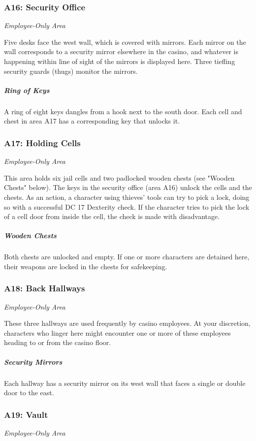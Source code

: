 \documentclass[10pt,a4paper,twoside,bg=print,twocolumn,openany,nodeprecatedcode]{dndbook}
\begin{document}
\subsubsection{A16: Security Office}
\textit{Employee-Only Area}

Five desks face the west wall, which is covered with mirrors. Each mirror on the wall corresponds to a security mirror elsewhere in the casino, and whatever is happening within line of sight of the mirrors is displayed here. Three tiefling security guards (thugs) monitor the mirrors.

\subparagraph{Ring of Keys}
A ring of eight keys dangles from a hook next to the south door. Each cell and chest in area A17 has a corresponding key that unlocks it.

\subsubsection{A17: Holding Cells}
\textit{Employee-Only Area}

This area holds six jail cells and two padlocked wooden chests (see "Wooden Chests" below). The keys in the security office (area A16) unlock the cells and the chests. As an action, a character using thieves' tools can try to pick a lock, doing so with a successful DC 17 Dexterity check. If the character tries to pick the lock of a cell door from inside the cell, the check is made with disadvantage.

\subparagraph{Wooden Chests}
Both chests are unlocked and empty. If one or more characters are detained here, their weapons are locked in the chests for safekeeping.

\subsubsection{A18: Back Hallways}
\textit{Employee-Only Area}

These three hallways are used frequently by casino employees. At your discretion, characters who linger here might encounter one or more of these employees heading to or from the casino floor.

\subparagraph{Security Mirrors}
Each hallway has a security mirror on its west wall that faces a single or double door to the east.

\subsubsection{A19: Vault}
\textit{Employee-Only Area}
\end{document}
